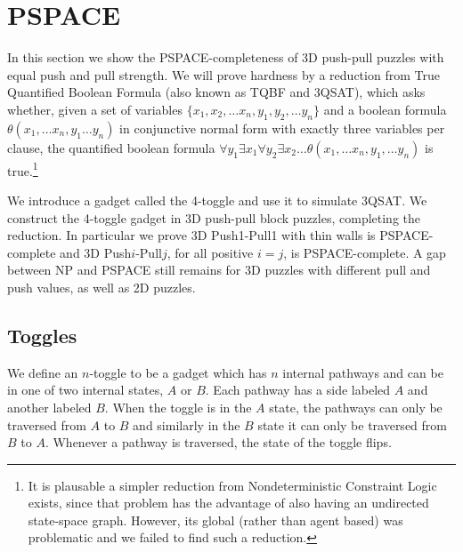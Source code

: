 \section{PSPACE}
\label{3DPSPACE}
In this section we show the PSPACE-completeness of 3D push-pull puzzles with equal push and pull strength. We will prove hardness by a reduction from True Quantified Boolean Formula (also known as TQBF and 3QSAT), which asks whether, given a set of variables $\{x_1, x_2, \ldots x_n, y_1, y_2, \ldots y_n\}$ and a boolean formula $\theta(x_1, \ldots x_n, y_1 \ldots y_n)$ in conjunctive normal form with exactly three variables per clause, the quantified boolean formula $\forall y_1 \exists x_1 \forall y_2 \exists x_2 \ldots \theta(x_1, \ldots x_n, y_1, \ldots y_n)$ is true.\footnote{It is plausable a simpler reduction from Nondeterministic Constraint Logic\cite{GPCBook09} exists, since that problem has the advantage of also having an undirected state-space graph. However, its global (rather than agent based) was problematic and we failed to find such a reduction.}

We introduce a gadget called the 4-toggle and use it to simulate 3QSAT\cite{NPBook}. We construct the 4-toggle gadget in 3D push-pull block puzzles, completing the reduction. In particular we prove 3D Push1-Pull1 with thin walls is PSPACE-complete and 3D Push$i$-Pull$j$, for all positive $i=j$, is PSPACE-complete. A gap between NP and PSPACE still remains for 3D puzzles with different pull and push values, as well as 2D puzzles. 


\subsection{Toggles}
We define an $n$-toggle to be a gadget which has $n$ internal pathways and can be in one of two internal states, $A$ or $B$. Each pathway has a side labeled $A$ and another labeled $B$. When the toggle is in the $A$ state, the pathways can only be traversed from $A$ to $B$ and similarly in the $B$ state it can only be traversed from $B$ to $A$. Whenever a pathway is traversed, the state of the toggle flips.


